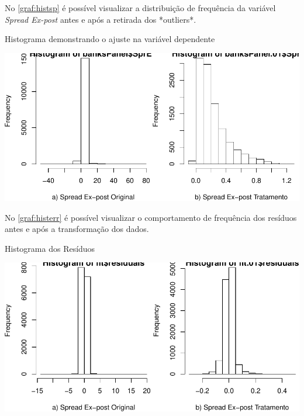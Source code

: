 \documentclass[
  12pt,
  12pt,
  openright,
  oneside,
  a4paper,
  chapter=TITLE,
  section=TITLE,
  subsection=TITLE,
  subsubsection=TITLE,
  portugues,
  sumario=tradicional]{abntex2}
\begin{document}
\begin{apendicesenv}
No \autoref{graf:histsp} é possível visualizar a distribuição de frequência da variável \emph{Spread Ex-post} antes e após a retirada dos *outliers*.

\begin{grafico}[!hbtp]
\vspace{20pt}
\caption{Histograma demonstrando o ajuste na variável dependente}
\vspace{-4mm}

\begin{center}\includegraphics[width=1\linewidth]{12-exportedfigures/hist.SprEp-1} \end{center}
\vspace{3mm}
\label{graf:histsp}
\vspace{-2mm}
\end{grafico}

No \autoref{graf:histerr} é possível visualizar o comportamento de frequência dos resíduos antes e após a transformação dos dados.

\begin{grafico}[!hbtp]
\vspace{20pt}
\caption{Histograma dos Resíduos}
\vspace{-4mm}

\begin{center}\includegraphics[width=1\linewidth]{12-exportedfigures/hist.residuals-1} \end{center}
\vspace{3mm}
\label{graf:histerr}
\vspace{-2mm}
\end{grafico}



\end{apendicesenv}
\end{document}
